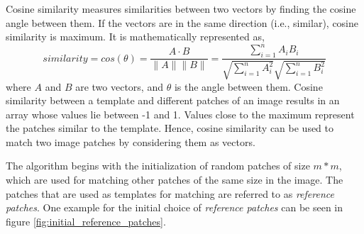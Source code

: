 \documentclass[fleqn,10pt]{wlscirep}
\begin{document}
	Cosine similarity  measures similarities between two vectors\cite{alake_understanding_2021} by finding the cosine angle between them. If the vectors are in the same direction (i.e., similar), cosine similarity is maximum. It is mathematically represented as,
	\begin{equation}
		similarity = cos(\theta) = \frac{A\cdot B}{\|A\|\|B\|} = \frac{\sum_{i=1}^{n}A_i B_i}{\sqrt{\sum_{i=1}^{n}A_i^2}\sqrt{\sum_{i=1}^{n}B_i^2}}
	\end{equation}
	where $A$ and $B$ are two vectors, and $\theta$ is the angle between them. Cosine similarity between a template and different patches of an image results in an array whose values lie between -1 and 1. Values close to the maximum represent the patches similar to the template.  Hence, cosine similarity can be used to match two image patches by considering them as vectors.
	
	
	

	
	
	The algorithm begins with the initialization of random patches of size $m*m$, which are used for matching other patches of the same size in the image. The patches that are used as templates for matching are referred to as \textit{reference patches}. One example for the initial choice of \textit{reference patches} can be seen in figure \ref{fig:initial_reference_patches}. 
	
	
	
	
\end{document}
